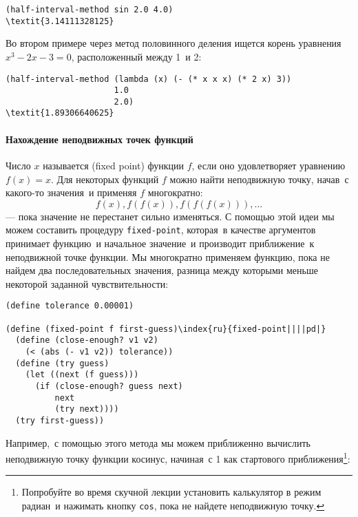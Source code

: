 \begin{Verbatim}[fontsize=\small]
(half-interval-method sin 2.0 4.0)
\textit{3.14111328125}
\end{Verbatim}

Во втором примере через метод половинного деления ищется
корень уравнения $x^3 - 2x - 3 = 0$, расположенный между 1~и 2:

\begin{Verbatim}[fontsize=\small]
(half-interval-method (lambda (x) (- (* x x x) (* 2 x) 3))
                      1.0
                      2.0)
\textit{1.89306640625}
\end{Verbatim}

\paragraph{Нахождение неподвижных точек функций}


Число $x$ называется 
 (fixed point)
функции $f$, если оно удовлетворяет уравнению $f(x) =
x$.  Для некоторых функций $f$ можно найти
неподвижную точку, начав~с какого-то значения~и применяя
$f$ многократно:
$$
f(x), f(f(x)), f(f(f(x))), \ldots
$$
--- пока значение не перестанет сильно изменяться. С помощью этой идеи мы 
можем составить процедуру {\tt fixed-point}, которая~в качестве 
аргументов принимает функцию~и начальное значение~и производит
приближение~к неподвижной точке функции. Мы многократно применяем
функцию, пока не найдем два последовательных значения, разница между
которыми меньше некоторой заданной чувствительности:

\begin{Verbatim}[fontsize=\small]
(define tolerance 0.00001)

(define (fixed-point f first-guess)\index{ru}{fixed-point||||pd|}
  (define (close-enough? v1 v2)
    (< (abs (- v1 v2)) tolerance))
  (define (try guess)
    (let ((next (f guess)))
      (if (close-enough? guess next)
          next
          (try next))))
  (try first-guess))
\end{Verbatim}
Например,~с помощью этого метода мы можем приближенно вычислить
неподвижную точку функции косинус, начиная~с 1 как стартового 
приближения\footnote{Попробуйте во время 
скучной лекции установить
калькулятор в
режим радиан~и нажимать кнопку {\tt cos}, пока  
не найдете  неподвижную точку.
}:

